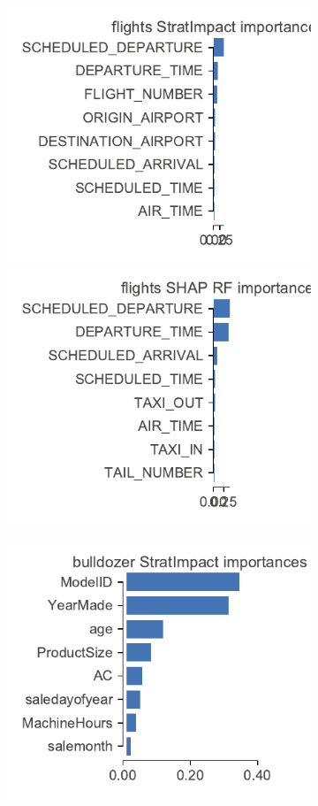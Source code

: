 \documentclass[twoside,11pt]{article}
\begin{document}
\begin{figure}
\begin{subfigure}{1\textwidth}
\includegraphics[scale=0.6]{images/flights-features.pdf}
\includegraphics[scale=0.6]{images/flights-features-shap-rf.pdf}
\vspace{-2mm}\vspace{3mm}
\end{subfigure}
\hfill
\begin{subfigure}{1\textwidth}
    \centering
\includegraphics[scale=0.6]{images/bulldozer-features.pdf}

\end{subfigure}
\end{figure}
\end{document}
